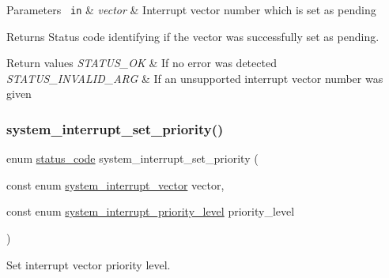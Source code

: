 \begin{DoxyParams}[1]{Parameters}
\mbox{\texttt{ in}}  & {\em vector} & Interrupt vector number which is set as pending\\
\hline
\end{DoxyParams}
\begin{DoxyReturn}{Returns}
Status code identifying if the vector was successfully set as pending.
\end{DoxyReturn}

\begin{DoxyRetVals}{Return values}
{\em S\+T\+A\+T\+U\+S\+\_\+\+OK} & If no error was detected \\
\hline
{\em S\+T\+A\+T\+U\+S\+\_\+\+I\+N\+V\+A\+L\+I\+D\+\_\+\+A\+RG} & If an unsupported interrupt vector number was given \\
\hline
\end{DoxyRetVals}
\mbox{\label{group__asfdoc__sam0__system__interrupt__group_ga0be1259c9dc64c3dd8f0d45e3f04ee76}} 
\subsubsection{\texorpdfstring{system\_interrupt\_set\_priority()}{system\_interrupt\_set\_priority()}}
{\footnotesize\ttfamily enum \mbox{\hyperlink{group__group__sam0__utils__status__codes_ga751c892e5a46b8e7d282085a5a5bf151}{status\+\_\+code}} system\+\_\+interrupt\+\_\+set\+\_\+priority (\begin{DoxyParamCaption}\item[{const enum \mbox{\hyperlink{group__asfdoc__sam0__system__interrupt__group_ga43378e6222cc05290c1a0c6a9ba125cf}{system\+\_\+interrupt\+\_\+vector}}}]{vector,  }\item[{const enum \mbox{\hyperlink{group__asfdoc__sam0__system__interrupt__group_ga6d21907577ff204de7f5fa4642c84589}{system\+\_\+interrupt\+\_\+priority\+\_\+level}}}]{priority\+\_\+level }\end{DoxyParamCaption})}



Set interrupt vector priority level. 

